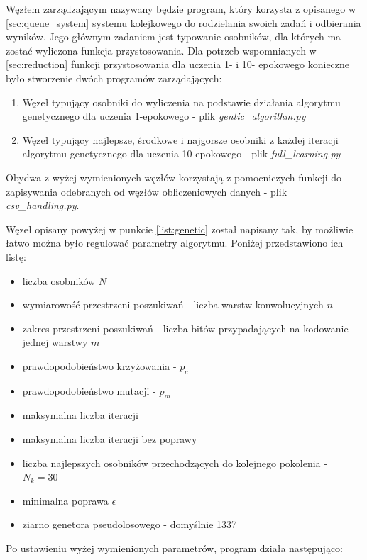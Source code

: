 Węzłem zarządzającym nazywany będzie program, który korzysta z opisanego w \ref{sec:queue_system} systemu kolejkowego do rodzielania swoich zadań i odbierania wyników.
Jego głównym zadaniem jest typowanie osobników, dla których ma zostać wyliczona funkcja przystosowania.
Dla potrzeb wspomnianych w \ref{sec:reduction} funkcji przystosowania dla uczenia 1- i 10- epokowego konieczne było stworzenie dwóch programów zarządających:
\begin{enumerate}
  \item Węzeł typujący osobniki do wyliczenia na podstawie działania algorytmu genetycznego dla uczenia 1-epokowego - plik \textit{gentic\_algorithm.py}\label{list:genetic}
  \item Węzeł typujący najlepsze, środkowe i najgorsze osobniki z każdej iteracji algorytmu genetycznego dla uczenia 10-epokowego - plik \textit{full\_learning.py}\label{list:full}
\end{enumerate}
Obydwa z wyżej wymienionych węzłów korzystają z pomocniczych funkcji do zapisywania odebranych od węzłów obliczeniowych danych - plik \textit{csv\_handling.py}.

Węzeł opisany powyżej w punkcie \ref{list:genetic} został napisany tak, by możliwie łatwo można było regulować parametry algorytmu.
Poniżej przedstawiono ich listę:
\begin{itemize}
  \item liczba osobników $N$
  \item wymiarowość przestrzeni poszukiwań - liczba warstw konwolucyjnych $n$
  \item zakres przestrzeni poszukiwań - liczba bitów przypadających na kodowanie jednej warstwy $m$
  \item prawdopodobieństwo krzyżowania - $p_{c}$
  \item prawdopodobieństwo mutacji - $p_{m}$
  \item maksymalna liczba iteracji
  \item maksymalna liczba iteracji bez poprawy
  \item liczba najlepszych osobników przechodzących do kolejnego pokolenia - $ N_{k} = 30$
  \item minimalna poprawa $\epsilon$
  \item ziarno genetora pseudolosowego - domyślnie 1337
\end{itemize}

Po ustawieniu wyżej wymienionych parametrów, program działa następująco:

